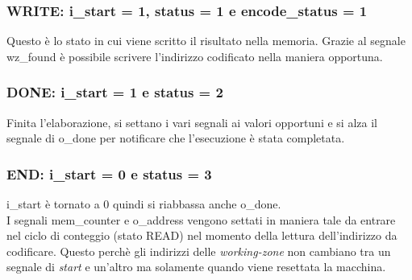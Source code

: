 \documentclass{article}
\begin{document}
\subsubsection{WRITE: {\selectfont i\_start} = 1, {\selectfont status} = 1 e {\selectfont encode\_status} = 1}
Questo è lo stato in cui viene scritto il risultato nella memoria. Grazie al segnale {\selectfont wz\_found} è possibile scrivere l'indirizzo codificato nella maniera opportuna.
\subsubsection{DONE: {\selectfont i\_start} = 1 e {\selectfont status} = 2}
Finita l'elaborazione, si settano i vari segnali ai valori opportuni e si alza il segnale di {\selectfont o\_done} per notificare che l'esecuzione è stata completata.
\subsubsection{END: {\selectfont i\_start} = 0 e {\selectfont status} = 3}
{\selectfont i\_start} è tornato a 0 quindi si riabbassa anche {\selectfont o\_done}.\\
I segnali {\selectfont mem\_counter} e {\selectfont o\_address} vengono settati in maniera tale da entrare nel ciclo di conteggio (stato READ) nel momento della lettura dell'indirizzo da codificare. Questo perchè gli indirizzi delle \textit{working-zone} non cambiano tra un segnale di \textit{start} e un'altro ma solamente quando viene resettata la macchina.
\pagebreak
\end{document}
